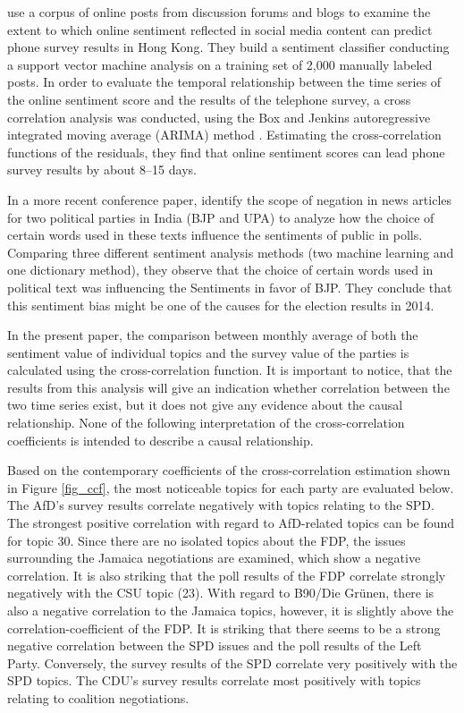 \documentclass[12pt,a4paper,notitlepage]{article}
\begin{document}
\citet{fu_analyzing_2013} use a corpus of online posts from discussion forums and blogs to examine the extent to which online sentiment reflected in social media content can predict phone survey results in Hong Kong. They build a sentiment classifier conducting a support vector machine analysis on a training set of 2,000 manually labeled posts. In order to evaluate the temporal relationship between the time series of the online sentiment score and the results of the telephone survey, a cross correlation analysis was conducted, using the Box and Jenkins autoregressive integrated moving average (ARIMA) method \citep{box_time_2008}. Estimating the cross-correlation functions of the residuals, they find that online sentiment scores can lead phone survey results by about 8–15 days. 

In a more recent conference paper, \citet{padmaja_evaluating_2014} identify the scope of negation in news articles for two political parties in India (BJP and UPA) to analyze how the choice of certain words used in these texts influence the sentiments of public in polls. Comparing three different sentiment analysis methods (two machine learning and one dictionary method), they observe that the choice of certain words used in political text was influencing the Sentiments in favor of BJP. They conclude that this sentiment bias might be one of the causes for the election results in 2014.

In the present paper, the comparison between monthly average of both the sentiment value of individual topics and the survey value of the parties is calculated using the cross-correlation function. It is important to notice, that the results from this analysis will give an indication whether correlation between the two time series exist, but it does not give any evidence about the causal relationship. None of the following interpretation of the cross-correlation coefficients is intended to describe a causal relationship.

Based on the contemporary coefficients of the cross-correlation estimation shown in Figure \ref{fig_ccf}, the most noticeable topics for each party are evaluated below. The AfD's survey results correlate negatively with topics relating to the SPD. The strongest positive correlation with regard to AfD-related topics can be found for topic 30. Since there are no isolated topics about the FDP, the issues surrounding the Jamaica negotiations are examined, which show a negative correlation. It is also striking that the poll results of the FDP correlate strongly negatively with the CSU topic (23). With regard to B90/Die Grünen, there is also a negative correlation to the Jamaica topics, however, it is slightly above the correlation-coefficient of the FDP. It is striking that there seems to be a strong negative correlation between the SPD issues and the poll results of the Left Party. Conversely, the survey results of the SPD correlate very positively with the SPD topics. The CDU's survey results correlate most positively with topics relating to coalition negotiations.
\end{document}
